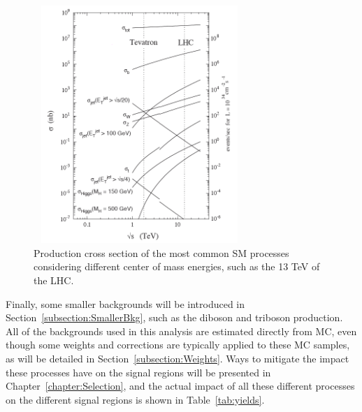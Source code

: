 \documentclass[a4paper, 10pt, openright]{report}
\begin{document}
\begin{figure}[htbp]
\begin{center}
\includegraphics[width=8cm, height=9cm]{figs/ProcessesXS.png}
\caption{Production cross section of the most common \ac{SM} processes considering different center of mass energies, such as the 13 TeV of the \ac{LHC}.}
\label{fig:ProcessesXS}
\end{center}
\end{figure}

Finally, some smaller backgrounds will be introduced in Section~\ref{subsection:SmallerBkg}, such as the diboson and triboson production. All of the backgrounds used in this analysis are estimated directly from \ac{MC}, even though some weights and corrections are typically applied to these \ac{MC} samples, as will be detailed in Section~\ref{subsection:Weights}. Ways to mitigate the impact these processes have on the signal regions will be presented in Chapter~\ref{chapter:Selection}, and the actual impact of all these different processes on the different signal regions is shown in Table~\ref{tab:yields}.
\end{document}
